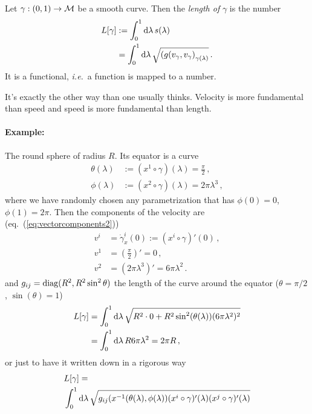 \documentclass[11pt, a4paper, twocolumn]{article} %
\begin{document}
\begin{defn}[]
    Let $\gamma: (0,1)\to \mathcal{M}$ be a smooth curve.
    Then the \textit{length of} $\gamma$ is the number
    \begin{align}
        L[\gamma] &:= \int_0^1 \operatorname{d\!} \lambda\, s(\lambda) \\
        &= \int_0^1\operatorname{d\!} \lambda\, \sqrt{\left( g(v_\gamma,v_\gamma \right)_{\gamma(\lambda)}}\,.\nonumber
    \end{align}
    It is a functional, \textit{i.e.}\ a function is mapped to a number.
\end{defn}
\begin{note}
    It's exactly the other way than one usually thinks.
    Velocity is more fundamental than speed and speed is more fundamental than
    length.
\end{note}

\paragraph{Example:} The round sphere of radius $R$.
Its equator is a curve
\begin{align}
    \theta(\lambda) &:= (x^1\circ \gamma)(\lambda) = \frac{\pi}{2}\,,\\
    \phi(\lambda) &:= (x^2\circ\gamma)(\lambda) = 2\pi \lambda^3\,,
\end{align}
where we have randomly chosen any parametrization that has
$\phi(0) = 0$, $\phi(1) = 2\pi$.
Then the components of the velocity are (eq.~(\ref{eq:vectorcomponents2}))
\begin{align*}
    v^i &= \dot{\gamma}_x^i (0) := (x^i\circ\gamma)'(0)\,,\\
    v^1 &= \left( \frac{\pi}{2} \right)' = 0\,,\\
    v^2 &= \left( 2\pi \lambda^3 \right)' = 6\pi \lambda^2\,.
\end{align*}
and $g_{ij} = \operatorname{diag}(R^2, R^2 \sin^2\theta)$ the length of the curve around the equator
($\theta = \pi/2$, $\sin(\theta) = 1$)
\begin{align*}
    L[\gamma] &= \int_0^1\operatorname{d\!}\lambda\,\sqrt{R^2\cdot 0 + R^2 \sin^2(\theta(\lambda))(6\pi\lambda^2)^2}\\
    &= \int_0^1\operatorname{d\!}\lambda\, R 6 \pi \lambda^2 = 2\pi R\,,
\end{align*}
or just to have it written down in a rigorous way
\begin{align*}
    &L[\gamma] =\\
    &\int_0^1\operatorname{d\!}\lambda\,\sqrt{g_{ij}(x^{-1}(\theta(\lambda),\phi(\lambda))(x^i\circ\gamma)'(\lambda)
        (x^j\circ\gamma)'(\lambda)}
\end{align*}
\end{document}
